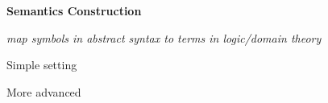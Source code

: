 \textbf{Semantics Construction}

\textit{map symbols in abstract syntax to terms in logic/domain theory}

\vspace{0.5em}
\begin{minipage}[t]{0.4\textwidth}
\parbox[t][1em][t]{\textwidth}{\centering Simple setting}\par
{}
\end{minipage}
\hspace{1em}
\begin{minipage}[t]{0.5\textwidth}
\parbox[t][1em][t]{\textwidth}{\centering More advanced}\par
{}
\end{minipage}
